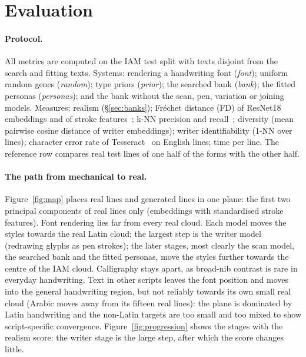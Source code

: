 \documentclass[10pt,twocolumn]{article}
\begin{document}
\section{Evaluation}
\label{sec:eval}

\paragraph{Protocol.} All metrics are computed on the IAM test split with texts disjoint from the search and
fitting texts. Systems: rendering a handwriting font (\emph{font}); uniform random genes (\emph{random}); type
priors (\emph{prior}); the searched bank (\emph{bank}); the fitted personas (\emph{personas}); and the bank without
the scan, pen, variation or joining models. Measures: realism (\S\ref{sec:banks}); Fr\'echet distance (FD) of
ResNet18 embeddings and of stroke features~\cite{heusel2017}; k-NN precision and recall~\cite{kynkaanniemi2019};
diversity (mean pairwise cosine distance of writer embeddings); writer identifiability (1-NN over lines);
character error rate of Tesseract~\cite{smith2007} on English lines; time per line. The reference row compares
real test lines of one half of the forms with the other half.



\paragraph{The path from mechanical to real.} Figure~\ref{fig:map} places real lines and generated lines in one
plane: the first two principal components of real lines only (embeddings with standardised stroke features). Font
rendering lies far from every real cloud. Each model moves the styles towards the real Latin cloud; the largest
step is the writer model (redrawing glyphs as pen strokes); the later stages, most clearly the scan model, the
searched bank and the fitted personas, move the styles further towards the centre of the IAM cloud. Calligraphy
stays apart, as broad-nib contrast is rare in everyday handwriting. Text in other scripts leaves the font position
and moves into the general handwriting region, but not reliably towards its own small real cloud (Arabic moves
away from its fifteen real lines): the plane is dominated by Latin handwriting and the non-Latin targets are too
small and too mixed to show script-specific convergence. Figure~\ref{fig:progression} shows the stages with the
realism score: the writer stage is the large step, after which the score changes little.
\end{document}
